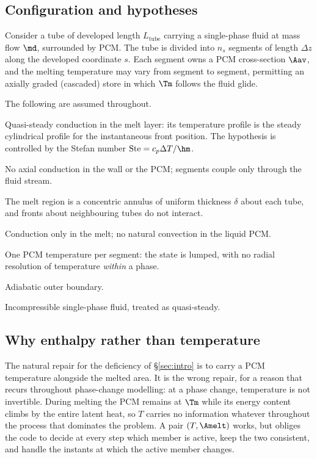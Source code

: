 \subsection{Configuration and hypotheses}

Consider a tube of developed length $L_{\mathrm{tube}}$ carrying a
single-phase fluid at mass flow $\md$, surrounded by PCM. The tube is divided
into $n_{s}$ segments of length $\Delta z$ along the developed coordinate $s$.
Each segment owns a PCM cross-section $\Aav$, and the melting temperature may
vary from segment to segment, permitting an axially graded (cascaded) store in
which $\Tm$ follows the fluid glide.

The following are assumed throughout.

\begin{description}[leftmargin=1.9em,itemsep=2pt]
\item[H1] Quasi-steady conduction in the melt layer: its temperature profile is
  the steady cylindrical profile for the instantaneous front position. The
  hypothesis is controlled by the Stefan number
  $\mathrm{Ste}=c_{p}\Delta T/\hm$.
\item[H2] No axial conduction in the wall or the PCM; segments couple only
  through the fluid stream.
\item[H3] The melt region is a concentric annulus of uniform thickness $\delta$
  about each tube, and fronts about neighbouring tubes do not interact.
\item[H4] Conduction only in the melt; no natural convection in the liquid PCM.
\item[H5] One PCM temperature per segment: the state is lumped, with no radial
  resolution of temperature \emph{within} a phase.
\item[H6] Adiabatic outer boundary.
\item[H7] Incompressible single-phase fluid, treated as quasi-steady.
\end{description}

\subsection{Why enthalpy rather than temperature}

The natural repair for the deficiency of \S\ref{sec:intro} is to carry a PCM
temperature alongside the melted area. It is the wrong repair, for a reason that
recurs throughout phase-change modelling: at a phase change, temperature is not
invertible. During melting the PCM remains at $\Tm$ while its energy content
climbs by the entire latent heat, so $T$ carries no information whatever
throughout the process that dominates the problem. A pair $(T,\Amelt)$ works,
but obliges the code to decide at every step which member is active, keep the
two consistent, and handle the instants at which the active member changes.

